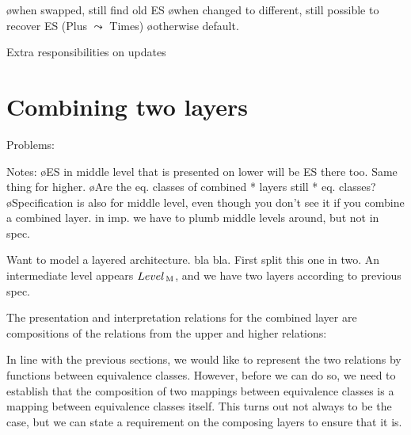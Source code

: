 \bl
\o when swapped, still find old ES
\o when changed to different, still possible to recover ES (Plus $\leadsto$ Times)
\o otherwise default.
\el

Extra responsibilities on updates
\fromHere

%
%







%																
%																
%																
\section{Combining two layers}  \label{sect:combinedExtra}


Problems:

Notes:
\bl
\o ES in middle level that is presented on lower will be ES there too. Same thing for higher.
\o Are the eq. classes of combined * layers still * eq. classes?
\o Specification is also for middle level, even though you don't see it if you combine a  combined layer. in imp. we have to plumb middle levels around, but not in spec.
\el


Want to model a layered architecture. bla bla. First split this one in two. An intermediate level appears $Level_{\, \mathrm M}$, and we have two layers according to previous spec. 


The presentation and interpretation relations for the combined layer are compositions of the relations from the upper and higher relations: %

\xpr{
\Present\C = \Present\L \oo \Present\H\\
\Interpret\C = \Interpret\H \oo\Interpret\L
}

In line with the previous sections, we would like to represent the two relations by functions between equivalence classes. However, before we can do so, we need to establish that the composition of two mappings between equivalence classes is a mapping between equivalence classes itself. This turns out not always to be the case, but we can state a requirement on the composing layers to ensure that it is.


